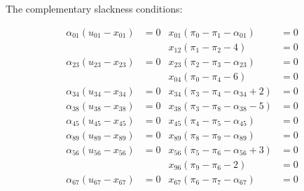 \documentclass[fleqn]{homework}
\begin{document}
\begin{problem}{3}
    The complementary slackness conditions:

    \begin{align*}
      \alpha_{01} (u_{01} - x_{01}) &= 0 &x_{01} (\pi_0 - \pi_1 - \alpha_{01}) &= 0 \\
                                    &    &x_{12} (\pi_1 - \pi_2 - 4) &= 0 \\          
      \alpha_{23} (u_{23} - x_{23}) &= 0 &x_{23} (\pi_2 - \pi_3 - \alpha_{23}) &= 0 \\
                                    &    &x_{04} (\pi_0 - \pi_4 - 6) &= 0 \\          
      \alpha_{34} (u_{34} - x_{34}) &= 0 &x_{34} (\pi_3 - \pi_4 - \alpha_{34} + 2) &= 0 \\
      \alpha_{38} (u_{38} - x_{38}) &= 0 &x_{38} (\pi_3 - \pi_8 - \alpha_{38} - 5) &= 0 \\
      \alpha_{45} (u_{45} - x_{45}) &= 0 &x_{45} (\pi_4 - \pi_5 - \alpha_{45}) &= 0 \\
      \alpha_{89} (u_{89} - x_{89}) &= 0 &x_{89} (\pi_8 - \pi_9 - \alpha_{89}) &= 0 \\
      \alpha_{56} (u_{56} - x_{56}) &= 0 &x_{56} (\pi_5 - \pi_6 - \alpha_{56} + 3) &= 0 \\
                                    &    &x_{96} (\pi_9 - \pi_6 - 2) &= 0 \\          
      \alpha_{67} (u_{67} - x_{67}) &= 0 &x_{67} (\pi_6 - \pi_7 - \alpha_{67}) &= 0 \\
    \end{align*}
    
  \end{problem}
\end{document}
